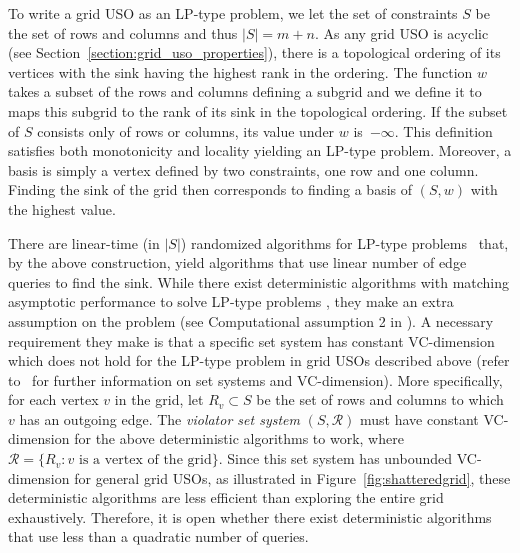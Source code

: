 \documentclass[runningheads,a4paper]{llncs}
\begin{document}
To write a grid USO as an LP-type problem, we let the set of constraints $S$ be the set of rows and columns and thus $|S| = m + n$. As any grid USO is acyclic (see Section~\ref{section:grid_uso_properties}), there is a topological ordering of its vertices with the sink having the highest rank in the ordering. 
The function $w$ takes a subset of the rows and columns defining a subgrid and we define it to maps this subgrid to the rank of its sink in the topological ordering. 
If the subset of $S$ consists only of rows or columns, its value under $w$ is~$-\infty$. 
This definition satisfies both monotonicity and locality yielding an LP-type problem.
Moreover, a basis is simply a vertex defined by two constraints, one row and one column.
Finding the sink of the grid then corresponds to finding a basis of $(S,w)$ with the highest value.

There are linear-time (in $|S|$) randomized algorithms for LP-type problems~\cite{MatousekSW96} that, by the above construction, yield algorithms that use linear number of edge queries to find the sink.
While there exist deterministic algorithms with matching asymptotic performance to solve LP-type problems \cite{chan16,ChazelleM96}, they make an extra assumption on the problem 
(see Computational assumption 2 in \cite{ChazelleM96}). 
A necessary requirement they make is that a specific set system has constant VC-dimension which does not hold for the LP-type problem in grid USOs described above (refer to~\cite{matouvsek2002lectures} for further information on set systems and VC-dimension). More specifically, for each vertex $v$ in the grid, let $R_v\subset S$ be the set of rows and columns to which $v$ has an outgoing edge. 
The \emph{violator set system} $(S, \mathcal R)$ must have constant VC-dimension for the above deterministic algorithms to work, where $\mathcal R = \{R_v : v\text{ is a vertex of the grid}\}$. 
Since this set system has unbounded VC-dimension for general grid USOs, as illustrated in Figure~\ref{fig:shatteredgrid}, these deterministic algorithms are less efficient than exploring the entire grid exhaustively. 
Therefore, it is open whether there exist deterministic algorithms that use less than a quadratic number of queries. 
\end{document}
